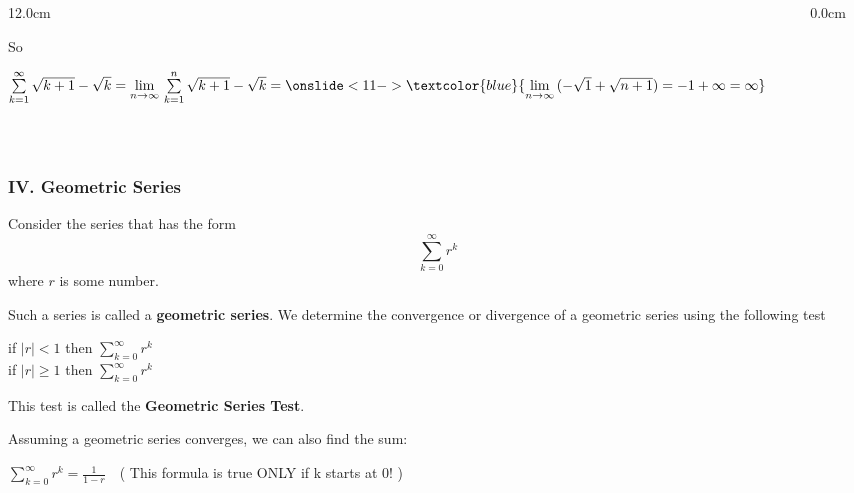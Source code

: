 \begin{frame}
\begin{columns}
\begin{column}{12.0cm}
	\vspace{0.2cm}
	
So \\

\vspace{0.4cm}

$\sum \limits_{k = 1}^{\infty} \sqrt{k+1} - \sqrt{k} = \lim \limits_{n \to \infty}\, \sum \limits_{k = 1}^{n} \sqrt{k+1} - \sqrt{k} = \onslide<11->{\textcolor{blue}{\lim \limits_{n \to \infty}\, (-\sqrt{1} + \sqrt{n+1}) = -1 + \infty = \infty}}$ \\

\vspace{0.2cm}

\vspace{4.0cm}

$\displaystyle{}$

\vspace{6.5cm}

\end{column}
\begin{column}{0.0cm}
	
\end{column}
\end{columns}
\end{frame}

\begin{frame}
\frametitle{IV. Geometric Series}
\scriptsize

Consider the series that has the form 
$$
\sum \limits_{k = 0}^{\infty} r^k
$$
where $r$ is some number. 

\vspace{0.2cm}

Such a series is called a {\bf geometric series}.  We determine the convergence or divergence of a geometric series using the following test

\begin{center}
	if \quad $|r| < 1$ \quad then \quad $\sum \limits_{k = 0}^{\infty} r^k$ \quad {}\\
	\vspace{0.2cm}
	if \quad $|r| \ge 1$ \quad then \quad $\sum \limits_{k = 0}^{\infty} r^k$ \quad \onslide<3->{\textcolor{blue}{diverges\,\,\,\,}}
\end{center}	

This test is called the {\bf Geometric Series Test}.

\vspace{0.2cm}

Assuming a geometric series converges, we can also find the sum:

\begin{center}
	$\displaystyle{\sum \limits_{k = 0}^{\infty} r^k = \frac{1}{1-r}}$ \,\, ( \alert{This formula is true ONLY if k starts at 0!} )	
\end{center}

\end{frame}

